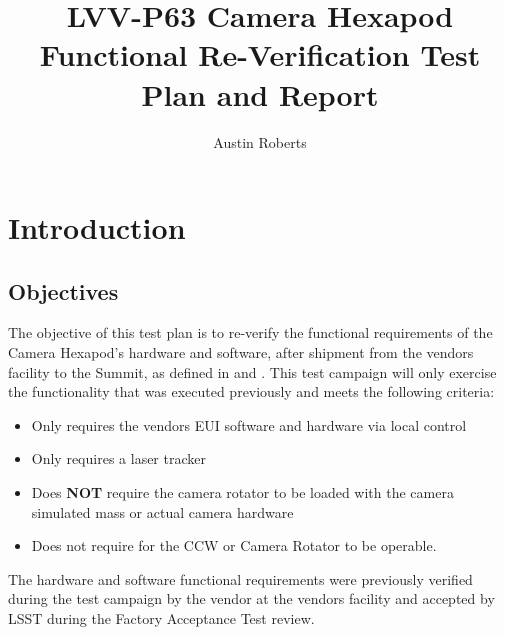 \documentclass[SE,lsstdraft,STR,toc]{lsstdoc}
\providecommand{\tightlist}{
  \setlength{\itemsep}{0pt}\setlength{\parskip}{0pt}}
\begin{document}
\def\milestoneName{Camera Hexapod Functional Re-Verification}
\def\milestoneId{LVV-P63}
\def\product{SIT-COM Integration}


\title{ LVV-P63 Camera Hexapod Functional Re-Verification Test Plan and Report}
\setDocRef{\lsstDocType-\lsstDocNum}
\date{\vcsdate}
\author{ Austin Roberts }






\maketitle

\section{Introduction}
\label{sect:intro}


\subsection{Objectives}
\label{sect:objectives}

 The objective of this test plan is to re-verify the functional
requirements of the Camera Hexapod's hardware and software, after
shipment from the vendors facility to the Summit, as defined in 
and . This test campaign will only exercise the functionality
that was executed previously and meets the following criteria:

\begin{itemize}
\tightlist
\item
  Only requires the vendors EUI software and hardware via local control
\item
  Only requires a laser tracker
\item
  Does \textbf{NOT} require the camera rotator to be loaded with the
  camera simulated mass or actual camera hardware
\item
  Does not require for the CCW or Camera Rotator to be operable.
\end{itemize}

The hardware and software functional requirements were previously
verified during the test campaign by the vendor at the vendors facility
and accepted by LSST during the Factory Acceptance Test review.
\end{document}
